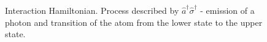 \begin{figure}
\centering



\caption{Interaction Hamiltonian. Process described by $\hat{a}^{\dag}\hat{\sigma}^{\dag}$ - emission
  of a photon and transition of the atom from the lower state to the upper state.}
\label{figPart1Ch2_2_4}
\end{figure}